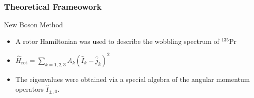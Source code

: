 \documentclass{beamer}
\begin{document}
\begin{frame}
	\frametitle{Theoretical Frameowork}

	\begin{block}{New Boson Method}
		\begin{itemize}
			\item A rotor Hamiltonian was used to describe the wobbling spectrum of $^{135}$Pr
			\item $\hat{H}_\text{rot}=\sum_{k=1,2,3}A_k\left(\hat{I}_k-\hat{j}_k\right)^2$
			\item The eigenvalues were obtained via a special algebra of the angular momentum operators $\hat{I}_{\pm,0}$.
		\end{itemize}
	\end{block}
\end{frame}
\end{document}
